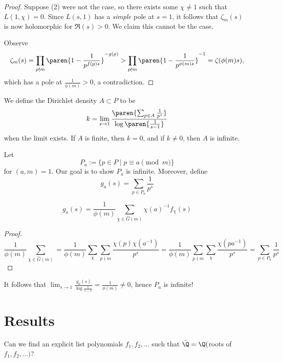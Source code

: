 \begin{proof}
    Suppose (2) were not the case, so there exists some $\chi \neq 1$ such that $L(1,\chi)=0$. Since $L(s,1)$ has a \textit{simple} pole at $s=1$, it follows that $\zeta_m(s)$ is now holomorphic for $\Re(s)>0$. We claim this cannot be the case.

    Observe
    $$\zeta_m(s) =\prod_{p \nmid m}\paren{1 - \frac{1}{p^{f(p)s}}}^{-g(p)} > \prod_{p \nmid m}\paren{1-\frac{1}{p^{\phi(m)s}}}^{-1}=\zeta(\phi(m)s),$$
    which has a pole at $\frac{1}{\phi(m)}>0$, a contradiction.
\end{proof}

\begin{defn}
    We define the Dirichlet density $A\subset P$ to be
    $$k=\lim_{s \to 1}\frac{\paren{ \sum_{p \in A} \frac{1}{p^s} }}{\log \paren{\frac{1}{s-1}}}$$
    when the limit exists. If $A$ is finite, then $k=0$, and if $k\neq 0$, then $A$ is infinite.
\end{defn}

\begin{defn}
    Let
    $$P_a := \{ p \in P \mid p \equiv a \pmod m\}$$
    for $(a,m)=1$. Our goal is to show $P_a$ is infinite. Moreover, define
    $$g_a(s) = \sum_{p \in P_a}\frac{1}{p^s}$$
\end{defn}

\begin{lem}
    $$g_a(s) = \frac{1}{\phi (m)}\sum_{\chi \in \hat G(m)}\chi (a)^{-1}f_\chi (s)$$
\end{lem}

\begin{proof}
    $$ \frac{1 }{\phi (m)}\sum _{\chi \in \hat G(m)} = \frac{1}{\phi(m)}\sum_{\chi}\sum_{p \nmid m} \frac{\chi (p)\chi(a^{-1})}{p^s}= \frac{1}{\phi (m)}\sum_{p \nmid m}\sum_{\chi}\frac{\chi (pa^{-1})}{p^s}=\sum_{p \in P_a}\frac{1}{p^s}$$
\end{proof}

It follows that $\lim_{s \to 1}\frac{g_a(s)}{\log\frac{1}{s-1}}=\frac{1}{\phi (m)} \neq 0$, hence $P_a$ is infinite!

\section{Results}

\begin{notebox*}[Question]
    Can we find an explicit list polynomials $f_1,f_2,\dots$ such that $\bar \Q = \Q($roots of $f_1,f_2,\dots)$?
\end{notebox*}


